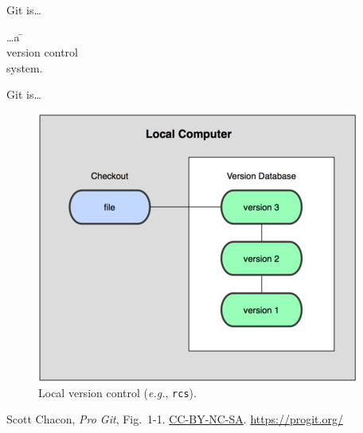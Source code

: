 \begin{frame}{Git is\ldots}
  \Huge {
    \begin{tabbing}
      \ldots a \= \color{ucMaroon}{distributed} \\
      \> version control \\
      \> system.
    \end{tabbing}
  }
\end{frame}

\begin{frame}{Git is\ldots}
  \begin{figure}
    \includegraphics[scale=0.8]{18333fig0101-tn.png}
    \\ Local version control (\emph{e.g.}, \texttt{rcs}).
  \end{figure}
  \footnotesize{Scott Chacon,
    \emph{Pro Git},
    Fig.~1-1.
    \href{https://creativecommons.org/licenses/by-nc-sa/3.0/legalcode}{CC-BY-NC-SA}.
    \href{https://progit.org/}{https://progit.org/}}

\end{frame}

